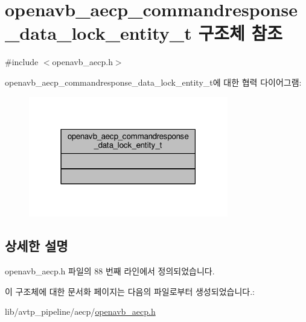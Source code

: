 \hypertarget{structopenavb__aecp__commandresponse__data__lock__entity__t}{}\section{openavb\+\_\+aecp\+\_\+commandresponse\+\_\+data\+\_\+lock\+\_\+entity\+\_\+t 구조체 참조}
\label{structopenavb__aecp__commandresponse__data__lock__entity__t}


{\ttfamily \#include $<$openavb\+\_\+aecp.\+h$>$}



openavb\+\_\+aecp\+\_\+commandresponse\+\_\+data\+\_\+lock\+\_\+entity\+\_\+t에 대한 협력 다이어그램\+:
\nopagebreak
\begin{figure}[H]
\begin{center}
\leavevmode
\includegraphics[width=247pt]{structopenavb__aecp__commandresponse__data__lock__entity__t__coll__graph}
\end{center}
\end{figure}


\subsection{상세한 설명}


openavb\+\_\+aecp.\+h 파일의 88 번째 라인에서 정의되었습니다.



이 구조체에 대한 문서화 페이지는 다음의 파일로부터 생성되었습니다.\+:\begin{DoxyCompactItemize}
\item 
lib/avtp\+\_\+pipeline/aecp/\hyperlink{openavb__aecp_8h}{openavb\+\_\+aecp.\+h}\end{DoxyCompactItemize}
